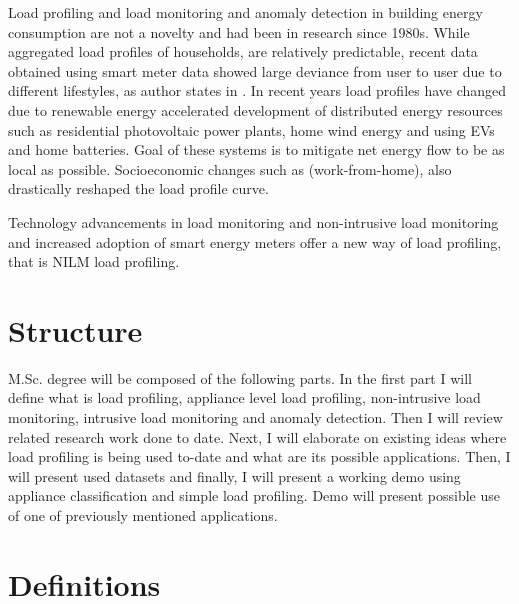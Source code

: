 \documentclass[
11pt, %
english, %
singlespacing, %
headsepline, %
]{MastersDoctoralThesis} %
\begin{document}

Load profiling and load monitoring and anomaly detection in building energy consumption are not a novelty and had been in research since 1980s. While aggregated load profiles of households, 
are relatively predictable, recent data obtained using smart meter data showed large deviance from user to user due to different lifestyles, as author states in \cite{Review2021}.
In recent years load profiles have changed due to renewable energy accelerated development of distributed energy resources such as residential photovoltaic
power plants, home wind energy and using EVs and home batteries. Goal of these systems is to mitigate net energy flow to be as local as possible. Socioeconomic changes such as (work-from-home),
also drastically reshaped the load profile curve. 


Technology advancements in load monitoring and non-intrusive load monitoring and increased adoption of smart energy meters offer a new
way of load profiling, that is NILM load profiling.

\section{Structure}
M.Sc. degree will be composed of the following parts. In the first part I will define what is load profiling, appliance level load profiling, 
non-intrusive load monitoring, intrusive load monitoring and anomaly detection. Then I will review related research work done to date. Next, I will elaborate 
on existing ideas where load profiling is being used to-date and what are its possible applications. Then, I will present used datasets and finally,
I will present a working demo using appliance classification and simple load profiling.
Demo will present possible use of one of previously mentioned applications. 

\section{Definitions}
\end{document}
